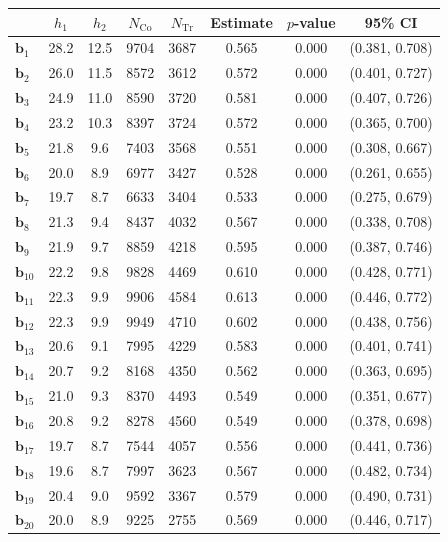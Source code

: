 \documentclass[10pt]{article}
\newcommand{\bb}{\mathbf{b}}
\begin{document}
\begin{table}[p]
    \centering
\begin{tabular}{lccccccc}
  \toprule\toprule
   & $h_1$ & $h_2$ & $N_{\mathrm{Co}}$ & $N_{\mathrm{Tr}}$ & Estimate & $p$-value & 95\% CI \\
  \midrule
   $\bb_{1}$ & 28.2 & 12.5 & 9704 & 3687 & 0.565 & 0.000 & (0.381, 0.708)\\
   $\bb_{2}$ & 26.0 & 11.5 & 8572 & 3612 & 0.572 & 0.000 & (0.401, 0.727)\\
   $\bb_{3}$ & 24.9 & 11.0 & 8590 & 3720 & 0.581 & 0.000 & (0.407, 0.726)\\
   $\bb_{4}$ & 23.2 & 10.3 & 8397 & 3724 & 0.572 & 0.000 & (0.365, 0.700)\\
   $\bb_{5}$ & 21.8 & 9.6 & 7403 & 3568 & 0.551 & 0.000 & (0.308, 0.667)\\
   $\bb_{6}$ & 20.0 & 8.9 & 6977 & 3427 & 0.528 & 0.000 & (0.261, 0.655)\\
   $\bb_{7}$ & 19.7 & 8.7 & 6633 & 3404 & 0.533 & 0.000 & (0.275, 0.679)\\
   $\bb_{8}$ & 21.3 & 9.4 & 8437 & 4032 & 0.567 & 0.000 & (0.338, 0.708)\\
   $\bb_{9}$ & 21.9 & 9.7 & 8859 & 4218 & 0.595 & 0.000 & (0.387, 0.746)\\
   $\bb_{10}$ & 22.2 & 9.8 & 9828 & 4469 & 0.610 & 0.000 & (0.428, 0.771)\\
   $\bb_{11}$ & 22.3 & 9.9 & 9906 & 4584 & 0.613 & 0.000 & (0.446, 0.772)\\
   $\bb_{12}$ & 22.3 & 9.9 & 9949 & 4710 & 0.602 & 0.000 & (0.438, 0.756)\\
   $\bb_{13}$ & 20.6 & 9.1 & 7995 & 4229 & 0.583 & 0.000 & (0.401, 0.741)\\
   $\bb_{14}$ & 20.7 & 9.2 & 8168 & 4350 & 0.562 & 0.000 & (0.363, 0.695)\\
   $\bb_{15}$ & 21.0 & 9.3 & 8370 & 4493 & 0.549 & 0.000 & (0.351, 0.677)\\
   $\bb_{16}$ & 20.8 & 9.2 & 8278 & 4560 & 0.549 & 0.000 & (0.378, 0.698)\\
   $\bb_{17}$ & 19.7 & 8.7 & 7544 & 4057 & 0.556 & 0.000 & (0.441, 0.736)\\
   $\bb_{18}$ & 19.6 & 8.7 & 7997 & 3623 & 0.567 & 0.000 & (0.482, 0.734)\\
   $\bb_{19}$ & 20.4 & 9.0 & 9592 & 3367 & 0.579 & 0.000 & (0.490, 0.731)\\
   $\bb_{20}$ & 20.0 & 8.9 & 9225 & 2755 & 0.569 & 0.000 & (0.446, 0.717)\\

\end{tabular}
\end{table}
\end{document}
